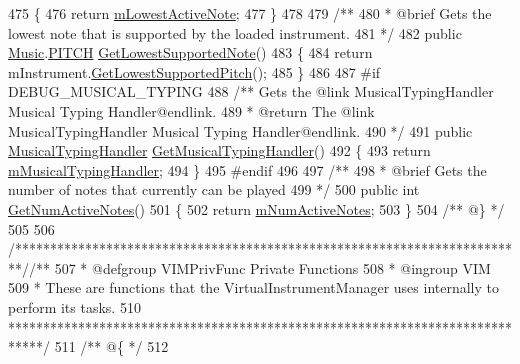 \begin{DoxyCodeInclude}
475     \{
476         \textcolor{keywordflow}{return} \hyperlink{group___v_i_m_priv_ga5e3a5116e0dabb37e0ea21d73ac1567e}{mLowestActiveNote};
477     \}
478 \textcolor{comment}{}
479 \textcolor{comment}{    /**}
480 \textcolor{comment}{     * @brief Gets the lowest note that is supported by the loaded instrument.}
481 \textcolor{comment}{    */}
482     \textcolor{keyword}{public} \hyperlink{class_music}{Music}.\hyperlink{group___music_enums_ga508f69b199ea518f935486c990edac1d}{PITCH} \hyperlink{group___v_i_m_pub_func_gaeb152486450d6c6dc50078e1644c4c6a}{GetLowestSupportedNote}()
483     \{
484         \textcolor{keywordflow}{return} mInstrument.\hyperlink{group___v_i_base_pub_func_gac42b3915bbfec60b83650abd701d0690}{GetLowestSupportedPitch}();
485     \}
486 
487 \textcolor{preprocessor}{    #if DEBUG\_MUSICAL\_TYPING}
488 \textcolor{comment}{        /** Gets the @link MusicalTypingHandler Musical Typing Handler@endlink.}
489 \textcolor{comment}{         * @return The @link MusicalTypingHandler Musical Typing Handler@endlink.}
490 \textcolor{comment}{        */}
491         \textcolor{keyword}{public} \hyperlink{class_musical_typing_handler}{MusicalTypingHandler} \hyperlink{group___v_i_m_pub_func_gae6701458a23a3f14db90501f871d4d0d}{GetMusicalTypingHandler}()
492         \{
493             \textcolor{keywordflow}{return} \hyperlink{group___v_i_m_priv_gad7b95bd21383d11ea0cbf33d79b78e09}{mMusicalTypingHandler};
494         \}
495 \textcolor{preprocessor}{    #endif}
496 \textcolor{comment}{}
497 \textcolor{comment}{    /**}
498 \textcolor{comment}{     * @brief Gets the number of notes that currently can be played}
499 \textcolor{comment}{    */}
500     \textcolor{keyword}{public} \textcolor{keywordtype}{int} \hyperlink{group___v_i_m_pub_func_ga3d6c823b1c1083eac8202f6c89e60b48}{GetNumActiveNotes}()
501     \{
502         \textcolor{keywordflow}{return} \hyperlink{group___v_i_m_priv_ga0f7e11945763c48057be326b661dfdaf}{mNumActiveNotes};
503     \}\textcolor{comment}{}
504 \textcolor{comment}{    /** @\} */}
505 
506     \textcolor{comment}{/*************************************************************************/}\textcolor{comment}{/** }
507 \textcolor{comment}{    * @defgroup VIMPrivFunc Private Functions}
508 \textcolor{comment}{    * @ingroup VIM}
509 \textcolor{comment}{    * These are functions that the VirtualInstrumentManager uses internally to perform its tasks.}
510 \textcolor{comment}{    *****************************************************************************/}\textcolor{comment}{}
511 \textcolor{comment}{    /** @\{ */}
512 \textcolor{comment}{}

\end{DoxyCodeInclude}
